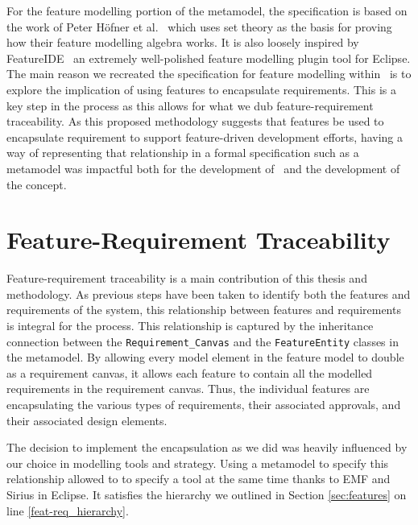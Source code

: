 For the feature modelling portion of the metamodel, the specification is based on the work of Peter H\"{o}fner et al.~\cite{hofner2006feature,hofner2011algebra} which uses set theory as the basis for proving how their feature modelling algebra works. It is also loosely inspired by FeatureIDE~\cite{kastner2009featureide, thum2014featureide} an extremely well-polished feature modelling plugin tool for Eclipse. The main reason we recreated the specification for feature modelling within \tool\ is to explore the implication of using features to encapsulate requirements. This is a key step in the process as this allows for what we dub feature-requirement traceability. As this proposed methodology suggests that features be used to encapsulate requirement to support feature-driven development efforts, having a way of representing that relationship in a formal specification such as a metamodel was impactful both for the development of \tool\ and the development of the concept.

\section{Feature-Requirement Traceability}
\label{sec:feat-req_traceability}

Feature-requirement traceability is a main contribution of this thesis and methodology. As previous steps have been taken to identify both the features and requirements of the system, this relationship between features and requirements is integral for the process. This relationship is captured by the inheritance connection between the \texttt{Requirement\_Canvas} and the \texttt{FeatureEntity} classes in the metamodel. By allowing every model element in the feature model to double as a requirement canvas, it allows each feature to contain all the modelled requirements in the requirement canvas. Thus, the individual features are encapsulating the various types of requirements, their associated approvals, and their associated design elements. 

The decision to implement the encapsulation as we did was heavily influenced by our choice in modelling tools and strategy. Using a metamodel to specify this relationship allowed to to specify a tool at the same time thanks to \ac{EMF} and Sirius in Eclipse. It satisfies the hierarchy we outlined in Section \ref{sec:features} on line \ref{feat-req_hierarchy}.


